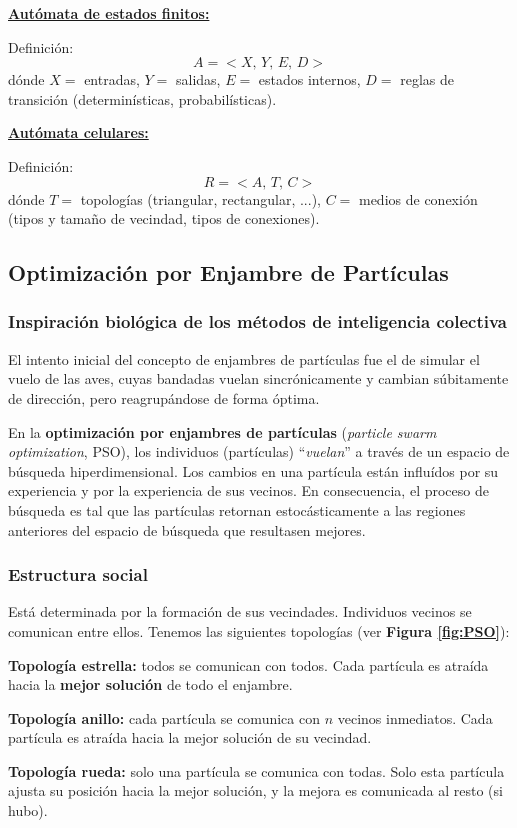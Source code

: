 \documentclass[10pt,a4paper]{article}
\begin{document}
\begin{multicols}{2}
\underline{\textbf{Autómata de estados finitos:}}

Definición: 
\[
A = < X,\,Y,\,E,\,D >
\]
dónde $X=$ entradas, $Y=$ salidas, $E=$ estados internos, $D=$ reglas de transición (determinísticas, probabilísticas).

\columnbreak

\underline{\textbf{Autómata celulares:}}

Definición: 
\[
R = < A,\,T,\,C >
\]
dónde $T=$ topologías (triangular, rectangular, ...), $C=$ medios de conexión (tipos y tamaño de vecindad, tipos de conexiones).
\end{multicols}

\subsection{Optimización por Enjambre de Partículas}

\subsubsection{Inspiración biológica de los métodos de inteligencia colectiva}

El intento inicial del concepto de enjambres de partículas fue el de simular el vuelo de las aves, cuyas bandadas vuelan sincrónicamente y cambian súbitamente de dirección, pero reagrupándose de forma óptima.

En la \textbf{optimización por enjambres de partículas} (\textit{particle swarm optimization}, PSO), los individuos (partículas) ``\textit{vuelan}'' a través de un espacio de búsqueda hiperdimensional. Los cambios en una partícula están influídos por su experiencia y por la experiencia de sus vecinos. En consecuencia, el proceso de búsqueda es tal que las partículas retornan estocásticamente a las regiones anteriores del espacio de búsqueda que resultasen mejores.

\subsubsection{Estructura social}

Está determinada por la formación de sus vecindades. Individuos vecinos se comunican entre ellos. Tenemos las siguientes topologías (ver \textbf{Figura \ref{fig:PSO}}):
\begin{description}
\item \textbf{Topología estrella:} todos se comunican con todos. Cada partícula es atraída hacia la \textbf{mejor solución} de todo el enjambre.
\item \textbf{Topología anillo:} cada partícula se comunica con $n$ vecinos inmediatos. Cada partícula es atraída hacia la mejor solución de su vecindad.
\item \textbf{Topología rueda:} solo una partícula se comunica con todas. Solo esta partícula ajusta su posición hacia la mejor solución, y la mejora es comunicada al resto (si hubo).
\end{description}
\end{document}
